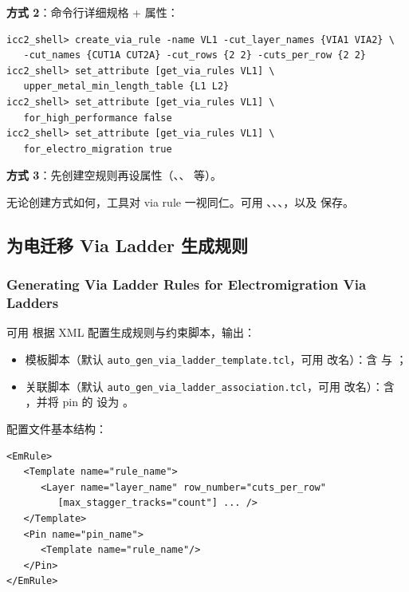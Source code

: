 \textbf{方式 2}：命令行详细规格 + 属性：
\begin{lstlisting}
icc2_shell> create_via_rule -name VL1 -cut_layer_names {VIA1 VIA2} \
   -cut_names {CUT1A CUT2A} -cut_rows {2 2} -cuts_per_row {2 2}
icc2_shell> set_attribute [get_via_rules VL1] \
   upper_metal_min_length_table {L1 L2}
icc2_shell> set_attribute [get_via_rules VL1] \
   for_high_performance false
icc2_shell> set_attribute [get_via_rules VL1] \
   for_electro_migration true
\end{lstlisting}

\textbf{方式 3}：先创建空规则再设属性（、、 等）。

无论创建方式如何，工具对 via rule 一视同仁。可用 、、、，以及  保存。

\subsection{为电迁移 Via Ladder 生成规则}
\subsubsection*{Generating Via Ladder Rules for Electromigration Via Ladders}

可用  根据 XML 配置生成规则与约束脚本，输出：
\begin{itemize}
  \item 模板脚本（默认 \texttt{auto\_gen\_via\_ladder\_template.tcl}，可用  改名）：含  与 ；
  \item 关联脚本（默认 \texttt{auto\_gen\_via\_ladder\_association.tcl}，可用  改名）：含 ，并将 pin 的  设为 。
\end{itemize}

配置文件基本结构：
\begin{lstlisting}
<EmRule>
   <Template name="rule_name">
      <Layer name="layer_name" row_number="cuts_per_row"
         [max_stagger_tracks="count"] ... />
   </Template>
   <Pin name="pin_name">
      <Template name="rule_name"/>
   </Pin>
</EmRule>
\end{lstlisting}

